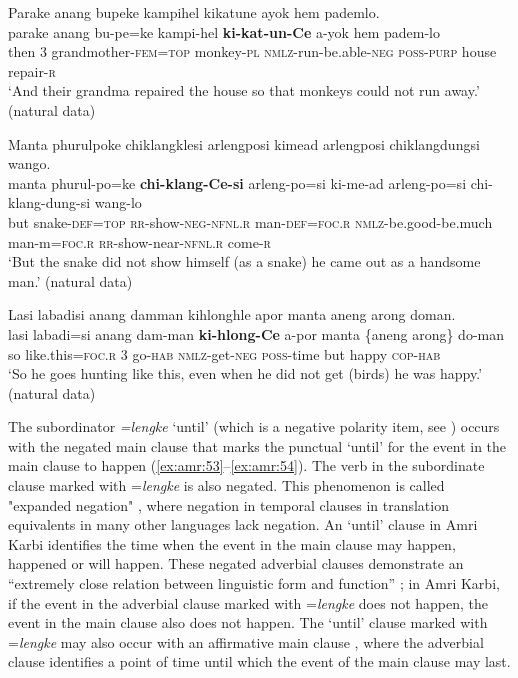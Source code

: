 \documentclass[output=paper,colorlinks,citecolor=brown]{langscibook}
\begin{document}
\ea\label{ex:amr:32} Parake anang bupeke kampihel kikatune ayok hem pademlo.  \\
    \gll parake anang bu-pe=ke kampi-hel \textbf{ki-kat-un-Ce} a-yok hem padem-lo\\
          then \textsc{3} grandmother-\textsc{fem=top} monkey-\textsc{pl} \textsc{nmlz}{}-run-be.able-\textsc{neg} \textsc{poss}{}-\textsc{purp} house repair-\textsc{r}\\
    \glt ‘And their grandma repaired the house so that monkeys could not run away.’ (natural data)
\z

\ea\label{ex:amr:33}Manta phurulpoke chiklangklesi arlengposi kimead arlengposi chiklangdungsi wango.\\
    \gll manta phurul-po=ke \textbf{chi-klang-Ce-si} arleng-po=si ki-me-ad arleng-po=si chi-klang-dung-si wang-lo\\
         but snake-\textsc{def}=\textsc{top} \textsc{rr}{}-show-\textsc{neg}{}-\textsc{nfnl}.\textsc{r} man-\textsc{def}=\textsc{foc.r} \textsc{nmlz}{}-be.good-be.much man-m=\textsc{foc}.\textsc{r} \textsc{rr}{}-show-near-\textsc{nfnl}.\textsc{r} come-\textsc{r}\\
    \glt ‘But the snake did not show himself (as a snake) he came out as a handsome man.’ (natural data)
\z

\ea\label{ex:amr:34}Lasi labadisi anang damman kihlonghle apor manta {aneng arong} doman.\\
    \gll lasi labadi=si anang dam-man \textbf{ki-hlong-Ce} a-por manta {\{aneng arong\}} do-man\\
         so like.this=\textsc{foc}.\textsc{r} 3 go-\textsc{hab} \textsc{nmlz}{}-get-\textsc{neg} \textsc{poss}{}-time but happy \textsc{cop}{}-\textsc{hab}\\
    \glt ‘So he goes hunting like this, even when he did not get (birds) he was happy.’ (natural data)
\z

The subordinator \textit{=lengke} `until' (which is a negative polarity item, see ) occurs with the negated main clause that marks the punctual ‘until’ for the event in the main clause to happen (\ref{ex:amr:53}--\ref{ex:amr:54}). The verb in the subordinate clause marked with =\textit{lengke} is also negated. This phenomenon is called "expanded negation" \citep[145]{Wälchli2018}, where negation in temporal clauses in translation equivalents in many other languages lack negation. An ‘until’ clause in Amri Karbi identifies the time when the event in the main clause may happen, happened or will happen. These negated adverbial clauses demonstrate an “extremely close relation between linguistic form and function” \citep[145--146]{Hetterle2015}; in Amri Karbi, if the event in the adverbial clause marked with =\textit{lengke} does not happen, the event in the main clause also does not happen. The ‘until’ clause marked with =\textit{lengke} may also occur with an affirmative main clause , where the adverbial clause identifies a point of time until which the event of the main clause may last. 
  
\end{document}
